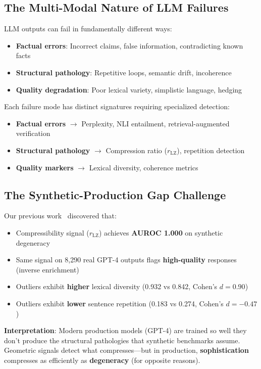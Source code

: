 \documentclass[11pt]{article}
\begin{document}
\subsection{The Multi-Modal Nature of LLM Failures}

LLM outputs can fail in fundamentally different ways:
\begin{itemize}
\item \textbf{Factual errors}: Incorrect claims, false information, contradicting known facts
\item \textbf{Structural pathology}: Repetitive loops, semantic drift, incoherence
\item \textbf{Quality degradation}: Poor lexical variety, simplistic language, hedging
\end{itemize}

Each failure mode has distinct signatures requiring specialized detection:
\begin{itemize}
\item \textbf{Factual errors} $\rightarrow$ Perplexity, NLI entailment, retrieval-augmented verification
\item \textbf{Structural pathology} $\rightarrow$ Compression ratio ($r_{\text{LZ}}$), repetition detection
\item \textbf{Quality markers} $\rightarrow$ Lexical diversity, coherence metrics
\end{itemize}

\subsection{The Synthetic-Production Gap Challenge}

Our previous work~\cite{khokhla2025synthetic} discovered that:
\begin{itemize}
\item Compressibility signal ($r_{\text{LZ}}$) achieves \textbf{AUROC 1.000} on synthetic degeneracy
\item Same signal on 8,290 real GPT-4 outputs flags \textbf{high-quality} responses (inverse enrichment)
\item Outliers exhibit \textbf{higher} lexical diversity (0.932 vs 0.842, Cohen's $d=0.90$)
\item Outliers exhibit \textbf{lower} sentence repetition (0.183 vs 0.274, Cohen's $d=-0.47$)
\end{itemize}

\textbf{Interpretation}: Modern production models (GPT-4) are trained so well they don't produce the structural pathologies that synthetic benchmarks assume. Geometric signals detect what compresses---but in production, \textbf{sophistication} compresses as efficiently as \textbf{degeneracy} (for opposite reasons).
\end{document}
